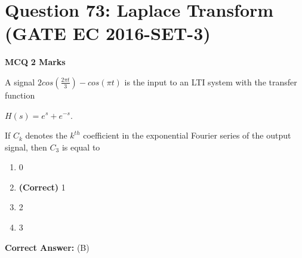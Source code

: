 \documentclass[11pt,a4paper]{article}
\begin{document}
\section*{Question 73: Laplace Transform (GATE EC 2016-SET-3)}
\noindent \textbf{\color{primary}MCQ} \hfill \textbf{\color{secondary}2 Marks}


\noindent A signal $2cos(\frac{2\pi t}{3})-cos(\pi t)$ is the input to an LTI system with the transfer function 

$H(s)=e^{s}+e^{-s}$.

 If $C_{k}$ denotes the $k^{th}$  coefficient in the exponential Fourier series of the output signal, then $C_{3}$ is equal to


\begin{enumerate}[label=(\Alph*)]
    \item 0
    \item \textbf{(Correct)} 1
    \item 2
    \item 3
\end{enumerate}

\noindent \textbf{Correct Answer:} (B)
\end{document}
